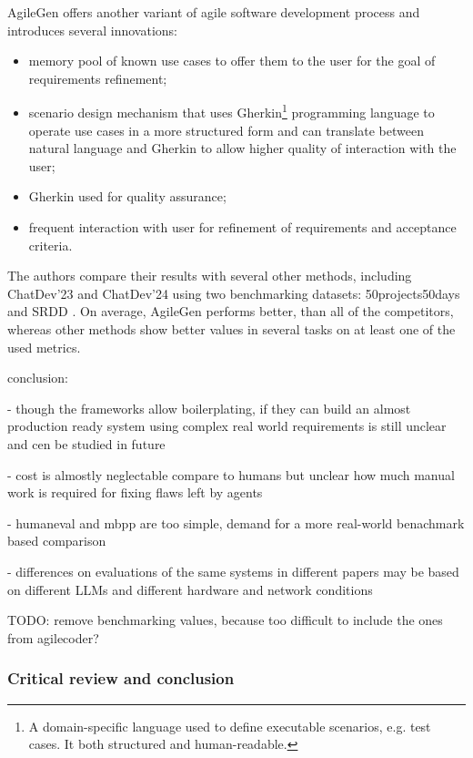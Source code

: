 AgileGen offers another variant of agile software development process and introduces several innovations: 

\begin{itemize}
	\item memory pool of known use cases to offer them to the user for the goal of requirements refinement;
	\item scenario design mechanism that uses Gherkin\footnote{A domain-specific language used to define executable scenarios, e.g. test cases. It both structured and human-readable.} \cite{gherkin} programming language to operate use cases in a more structured form and can translate between natural language and Gherkin to allow higher quality of interaction with the user;
	\item Gherkin used for quality assurance;
	\item frequent interaction with user for refinement of requirements and acceptance criteria.
\end{itemize}

The authors compare their results with several other methods, including ChatDev'23 and ChatDev'24 using  two benchmarking datasets: 50projects50days \cite{50p50d} and SRDD \cite{srdd}. On average, AgileGen performs better, than all of the competitors, whereas other methods show better values in several tasks on at least one of the used metrics.

  


conclusion:

- though the frameworks allow boilerplating, if they can build an almost production ready system using complex real world requirements is still unclear and cen be studied in future

- cost is almostly neglectable compare to humans but unclear how much manual work is required for fixing flaws left by agents

- humaneval and mbpp are too simple, demand for a more real-world benachmark based comparison

- differences on evaluations of the same systems in different papers may be based on different LLMs and different hardware and network conditions


TODO: remove benchmarking values, because too difficult to include the ones from agilecoder?



\subsubsection{Critical review and conclusion}
\label{mas:conclusion}

